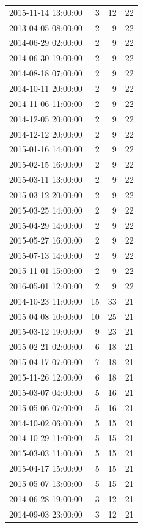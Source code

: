 \begin{tabular}{lrrr}
2015-11-14 13:00:00 & 3 & 12 & 22 \\
2013-04-05 08:00:00 & 2 & 9 & 22 \\
2014-06-29 02:00:00 & 2 & 9 & 22 \\
2014-06-30 19:00:00 & 2 & 9 & 22 \\
2014-08-18 07:00:00 & 2 & 9 & 22 \\
2014-10-11 20:00:00 & 2 & 9 & 22 \\
2014-11-06 11:00:00 & 2 & 9 & 22 \\
2014-12-05 20:00:00 & 2 & 9 & 22 \\
2014-12-12 20:00:00 & 2 & 9 & 22 \\
2015-01-16 14:00:00 & 2 & 9 & 22 \\
2015-02-15 16:00:00 & 2 & 9 & 22 \\
2015-03-11 13:00:00 & 2 & 9 & 22 \\
2015-03-12 20:00:00 & 2 & 9 & 22 \\
2015-03-25 14:00:00 & 2 & 9 & 22 \\
2015-04-29 14:00:00 & 2 & 9 & 22 \\
2015-05-27 16:00:00 & 2 & 9 & 22 \\
2015-07-13 14:00:00 & 2 & 9 & 22 \\
2015-11-01 15:00:00 & 2 & 9 & 22 \\
2016-05-01 12:00:00 & 2 & 9 & 22 \\
2014-10-23 11:00:00 & 15 & 33 & 21 \\
2015-04-08 10:00:00 & 10 & 25 & 21 \\
2015-03-12 19:00:00 & 9 & 23 & 21 \\
2015-02-21 02:00:00 & 6 & 18 & 21 \\
2015-04-17 07:00:00 & 7 & 18 & 21 \\
2015-11-26 12:00:00 & 6 & 18 & 21 \\
2015-03-07 04:00:00 & 5 & 16 & 21 \\
2015-05-06 07:00:00 & 5 & 16 & 21 \\
2014-10-02 06:00:00 & 5 & 15 & 21 \\
2014-10-29 11:00:00 & 5 & 15 & 21 \\
2015-03-03 11:00:00 & 5 & 15 & 21 \\
2015-04-17 15:00:00 & 5 & 15 & 21 \\
2015-05-07 13:00:00 & 5 & 15 & 21 \\
2014-06-28 19:00:00 & 3 & 12 & 21 \\
2014-09-03 23:00:00 & 3 & 12 & 21 \\

\end{tabular}
